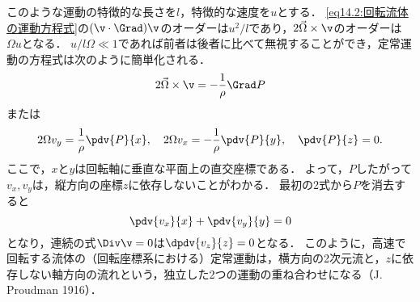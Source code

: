 このような運動の特徴的な長さを$l$，特徴的な速度を$u$とする．
\eqref{eq14.2:回転流体の運動方程式}の$(\v\cdot\Grad)\v$のオーダーは$u^2/l$であり，$2\vec{\Omega}\times\v$のオーダーは$\Omega u$となる．
$u/l\Omega \ll 1$であれば前者は後者に比べて無視することができ，定常運動の方程式は次のように簡単化される．
\begin{equation}
    2\vec{\Omega}\times\v = -\frac{1}{\rho} \Grad P 
\end{equation}
または
\[
    2\Omega v_y = \frac{1}{\rho} \pdv{P}{x}, \quad
    2\Omega v_x = -\frac{1}{\rho} \pdv{P}{y}, \quad
    \pdv{P}{z} = 0 .
\]
ここで，$x$と$y$は回転軸に垂直な平面上の直交座標である．
よって，$P$したがって$v_x,v_y$は，縦方向の座標$z$に依存しないことがわかる．
最初の2式から$P$を消去すると
\[
    \pdv{v_x}{x} + \pdv{v_y}{y} = 0
\]
となり，連続の式$\Div\v=0$は$\dpdv{v_z}{z}=0$となる．
このように，高速で回転する流体の（回転座標系における）定常運動は，横方向の2次元流と，$z$に依存しない軸方向の流れという，独立した2つの運動の重ね合わせになる（J. Proudman 1916）．




